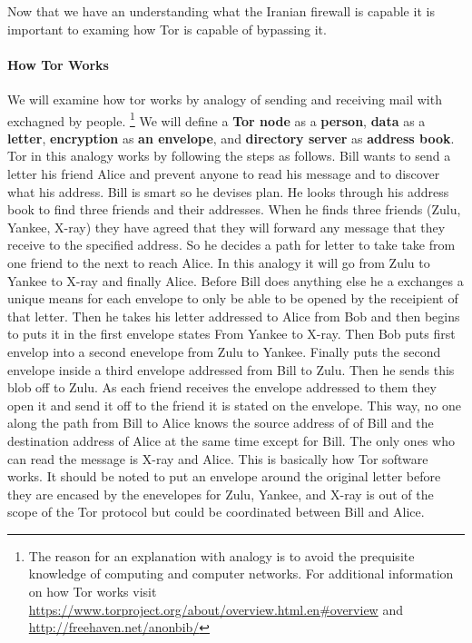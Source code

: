 \documentclass[11pt]{article}
\begin{document}
\begin{multicols}{2}
Now that we have an understanding what the Iranian firewall is capable it is
important to examing how Tor is capable of bypassing it.

\paragraph{How Tor Works}
\label{HowTorWorks}
We will examine how tor works by analogy of sending and receiving mail with
exchagned by people. 
\footnote{The reason for an explanation with analogy is to avoid the prequisite
  knowledge of computing and computer networks. For additional information on how 
  Tor works visit 
  \url{https://www.torproject.org/about/overview.html.en#overview} and
  \url{http://freehaven.net/anonbib/}
}
We will define a \textbf{Tor node} as a \textbf{person}, \textbf{data} as a
\textbf{letter}, \textbf{encryption} as \textbf{an envelope}, and
\textbf{directory server} as \textbf{address book}.  Tor in this analogy works
by following the steps as follows. Bill wants to send a letter his friend Alice
and prevent anyone to read his message and to discover what his address.  Bill
is smart so he devises plan. He looks through his address book to find three
friends and their addresses.  When he finds three friends (Zulu, Yankee, X-ray)
they have agreed that they will forward any message that they receive to the
specified address. So he decides a path for letter to take take from one friend
to the next to reach Alice. In this analogy it will go from Zulu to Yankee to
X-ray and finally Alice. Before Bill does anything else he a exchanges a unique
means for each envelope to only be able to be opened by the receipient of that
letter.  Then he takes his letter addressed to Alice from Bob and then begins to
puts it in the first envelope states From Yankee to X-ray.  Then Bob puts first
envelop into a second enevelope from Zulu to Yankee.  Finally puts the second
envelope inside a third envelope addressed from Bill to Zulu.  Then he sends
this blob off to Zulu.  As each friend receives the envelope addressed to them
they open it and send it off to the friend it is stated on the envelope.  This
way, no one along the path from Bill to Alice knows the source address of of
Bill and the destination address of Alice at the same time except for Bill.  The
only ones who can read the message is X-ray and Alice. This is basically how Tor
software works. It should be noted to put an envelope around the original letter
before they are encased by the enevelopes for Zulu, Yankee, and X-ray is out of
the scope of the Tor protocol but could be coordinated between Bill and Alice.


\end{multicols}
\end{document}
